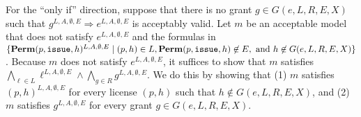 \documentclass{acmtrans2m}
\newcommand{\rimp}{\Rightarrow}
\newcommand{\<}{
}
\renewcommand{\>}{\rangle}
\newcommand{\Permitted}{\mathit{\bf Perm}}
\newcommand{\cc}{e}
\newcommand{\scc}{E}
\newcommand{\issue}{\mathtt{issue}}
\newcommand{\transwithE}[5]{#1^{#2, #3, #4, #5}}
\newcommand{\EX}{X}
\begin{document}
For the ``only if'' direction, suppose that there is no grant $g\in G(\cc, L, R, \scc, \EX)$ such that
$\transwithE{g}{L}{A}{\emptyset}{\scc}\rimp\transwithE{\cc}{L}{A}{\emptyset}{\scc}$ is acceptably valid.
Let $m$ be an acceptable model that does not satisfy $\transwithE{\cc}{L}{A}{\emptyset}{\scc}$ and the
formulas in $\{\transwithE{\Permitted(p, \issue, h)}{L}{A}{\emptyset}{\scc}\mid (p,h)\in L,
\Permitted(p, \issue, h)\not\in\scc, \mbox{ and } h\not\in G(\cc, L, R, \scc, \EX)\}$.  Because $m$ does
not satisfy $\transwithE{\cc}{L}{A}{\emptyset}{\scc}$, it suffices to show that $m$ satisfies
$\bigwedge_{\ell\in L}\transwithE{\ell}{L}{A}{\emptyset}{\scc}\land\bigwedge_{g\in R}\transwithE{g}{L}{A}{\emptyset}{\scc}$.  We do this by showing that (1) $m$ satisfies
$\transwithE{(p, h)}{L}{A}{\emptyset}{\scc}$ for every license $(p, h)$ such that
$h\not\in G(\cc, L, R, \scc, \EX)$, and (2) $m$ satisfies $\transwithE{g}{L}{A}{\emptyset}{\scc}$ for
every grant $g\in G(\cc, L, R, \scc, \EX)$.
\end{document}
